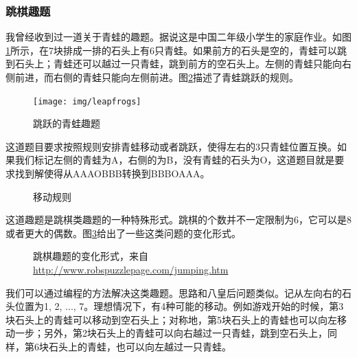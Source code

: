 \documentclass[b5paper]{ctexart}
\begin{document}
\subsubsection{跳棋趣题}

我曾经收到过一道关于青蛙的趣题。据说这是中国二年级小学生的家庭作业。如图\ref{fig:leapfrog}所示，在7块排成一排的石头上有6只青蛙。如果前方的石头是空的，青蛙可以跳到石头上；青蛙还可以越过一只青蛙，跳到前方的空石头上。左侧的青蛙只能向右侧前进，而右侧的青蛙只能向左侧前进。图\ref{fig:pegrules}描述了青蛙跳跃的规则。

\begin{figure}[htbp]
 \centering
 \texttt{[image: img/leapfrogs]}
 \caption{跳跃的青蛙趣题}
 \label{fig:leapfrog}
\end{figure}

这道题目要求按照规则安排青蛙移动或者跳跃，使得左右的3只青蛙位置互换。如果我们标记左侧的青蛙为A，右侧的为B，没有青蛙的石头为O，这道题目就是要求找到解使得从AAAOBBB转换到BBBOAAA。

\begin{figure}[htbp]
 \centering
  \hspace{0.02\textwidth}
  \hspace{0.02\textwidth}
 \caption{移动规则}
 \label{fig:pegrules}
\end{figure}

这道趣题是跳棋类趣题的一种特殊形式。跳棋的个数并不一定限制为6，它可以是8或者更大的偶数。图\ref{fig:pegpuzzles}给出了一些这类问题的变化形式。

\begin{figure}[htbp]
 \centering
  \hspace{0.02\textwidth}
  \hspace{0.02\textwidth}
 \caption{跳棋趣题的变化形式，来自 \url{http://www.robspuzzlepage.com/jumping.htm}}
 \label{fig:pegpuzzles}
\end{figure}

我们可以通过编程的方法解决这类趣题。思路和八皇后问题类似。记从左向右的石头位置为1, 2, ..., 7。理想情况下，有4种可能的移动。例如游戏开始的时候，第3块石头上的青蛙可以移动到空石头上；对称地，第5块石头上的青蛙也可以向左移动一步；另外，第2块石头上的青蛙可以向右越过一只青蛙，跳到空石头上，同样，第6块石头上的青蛙，也可以向左越过一只青蛙。
\end{document}
